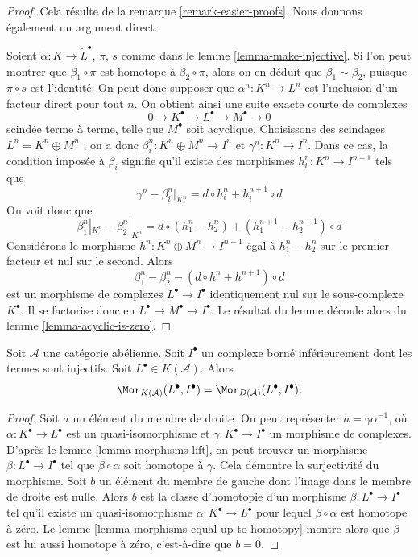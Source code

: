 \begin{proof}
Cela résulte de la remarque \ref{remark-easier-proofs}. Nous donnons également
un argument direct.

\medskip\noindent
Soient $\tilde \alpha : K \to \tilde L^\bullet$, $\pi$, $s$ comme
dans le lemme \ref{lemma-make-injective}. Si l'on peut montrer que
$\beta_1 \circ\pi$ est homotope à $\beta_2 \circ \pi$, alors on en déduit que
$\beta_1 \sim \beta_2$, puisque $\pi \circ s$ est l'identité. On peut donc
supposer que $\alpha^n : K^n \to L^n$ est l'inclusion d'un facteur direct pour
tout $n$. On obtient ainsi une suite exacte courte de complexes
$$
0 \to K^\bullet \to L^\bullet \to M^\bullet \to 0
$$
scindée terme à terme, telle que $M^\bullet$ soit acyclique. Choisissons des
scindages $L^n = K^n \oplus M^n$ ; on a donc
$\beta_i^n : K^n \oplus M^n \to I^n$ et $\gamma^n : K^n \to I^n$. Dans ce
cas, la condition imposée à $\beta_i$ signifie qu'il existe des morphismes
$h_i^n : K^n \to I^{n - 1}$ tels que
$$
\gamma^n - \beta_i^n|_{K^n} = d \circ h_i^n + h_i^{n + 1} \circ d
$$
On voit donc que
$$
\beta_1^n|_{K^n} - \beta_2^n|_{K^n}
=
d \circ (h_1^n - h_2^n) + (h_1^{n + 1} - h_2^{n + 1}) \circ d
$$
Considérons le morphisme $h^n : K^n \oplus M^n \to I^{n - 1}$ égal à
$h_1^n - h_2^n$ sur le premier facteur et nul sur le second. Alors
$$
\beta_1^n - \beta_2^n
-
(d \circ h^n + h^{n + 1}) \circ d
$$
est un morphisme de complexes $L^\bullet \to I^\bullet$ identiquement nul sur
le sous-complexe $K^\bullet$. Il se factorise donc en
$L^\bullet \to M^\bullet \to I^\bullet$. Le résultat du lemme découle alors
du lemme \ref{lemma-acyclic-is-zero}.
\end{proof}

\begin{lemma}
\label{lemma-morphisms-into-injective-complex}
Soit $\mathcal{A}$ une catégorie abélienne. Soit $I^\bullet$ un complexe borné
inférieurement dont les termes sont injectifs. Soit
$L^\bullet \in K(\mathcal{A})$. Alors
$$
\Mor_{K(\mathcal{A})}(L^\bullet, I^\bullet)
=
\Mor_{D(\mathcal{A})}(L^\bullet, I^\bullet).
$$
\end{lemma}

\begin{proof}
Soit $a$ un élément du membre de droite. On peut représenter
$a = \gamma\alpha^{-1}$, où $\alpha : K^\bullet \to L^\bullet$ est un
quasi-isomorphisme et $\gamma : K^\bullet \to I^\bullet$ un morphisme de
complexes. D'après le lemme \ref{lemma-morphisms-lift}, on peut trouver un
morphisme $\beta : L^\bullet \to I^\bullet$ tel que
$\beta \circ \alpha$ soit homotope à $\gamma$. Cela démontre la surjectivité
du morphisme. Soit $b$ un élément du membre de gauche dont l'image dans le
membre de droite est nulle. Alors $b$ est la classe d'homotopie d'un morphisme
$\beta : L^\bullet \to I^\bullet$ tel qu'il existe un quasi-isomorphisme
$\alpha : K^\bullet \to L^\bullet$ pour lequel $\beta  \circ \alpha$ est
homotope à zéro. Le lemme \ref{lemma-morphisms-equal-up-to-homotopy} montre
alors que $\beta$ est lui aussi homotope à zéro, c'est-à-dire que $b = 0$.
\end{proof}

